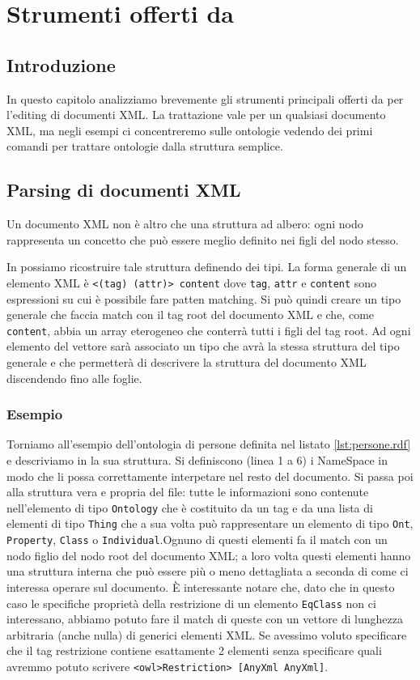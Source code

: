 \chapter{Strumenti offerti da \cduce}
\section*{Introduzione}
In questo capitolo analizziamo brevemente gli strumenti principali offerti da \cduce per l'editing di documenti XML. La trattazione vale per un qualsiasi documento XML, ma negli esempi ci concentreremo sulle ontologie vedendo dei primi comandi per trattare ontologie dalla struttura semplice. 


\section{Parsing di documenti XML}
Un documento XML non è altro che una struttura ad albero: ogni nodo rappresenta un concetto che può essere meglio definito nei figli del nodo stesso. 

In \cduce possiamo ricostruire tale struttura definendo dei tipi. La forma generale di un elemento XML è \verb|<(tag) (attr)> content| dove \verb|tag|, \verb|attr| e \verb|content| sono espressioni su cui è possibile fare patten matching. Si può quindi creare un tipo generale che faccia match con il tag root del documento XML e che, come \verb|content|, abbia un array eterogeneo che conterrà tutti i figli del tag root. Ad ogni elemento del vettore sarà associato un tipo che avrà la stessa struttura del tipo generale e che permetterà di descrivere la struttura del documento XML discendendo fino alle foglie.
\subsection{Esempio}
Torniamo all'esempio dell'ontologia di persone definita nel listato \ref{lst:persone.rdf} e descriviamo in \cduce la sua struttura.
Si definiscono (linea 1 a 6) i NameSpace in modo che \cduce li possa correttamente interpetare nel resto del documento. Si passa poi alla struttura vera e propria del file: tutte le informazioni sono contenute nell'elemento di tipo \verb|Ontology| che è costituito da un tag e da una lista di elementi di tipo \verb|Thing| che a sua volta può rappresentare un elemento di tipo \verb|Ont|, \verb|Property|, \verb|Class| o \verb|Individual|.Ognuno di questi elementi fa il match con un nodo figlio del nodo root del documento XML; a loro volta questi elementi hanno una struttura interna che può essere più o meno dettagliata a seconda di come ci interessa operare sul documento. È interessante notare che, dato che in questo caso le specifiche proprietà della restrizione di un elemento \verb|EqClass| non ci interessano, abbiamo potuto fare il match di queste con un vettore di lunghezza arbitraria (anche nulla) di generici elementi XML. Se avessimo voluto specificare che il tag restrizione contiene esattamente 2 elementi senza specificare quali avremmo potuto scrivere \verb|<owl>Restriction> [AnyXml AnyXml]|.

